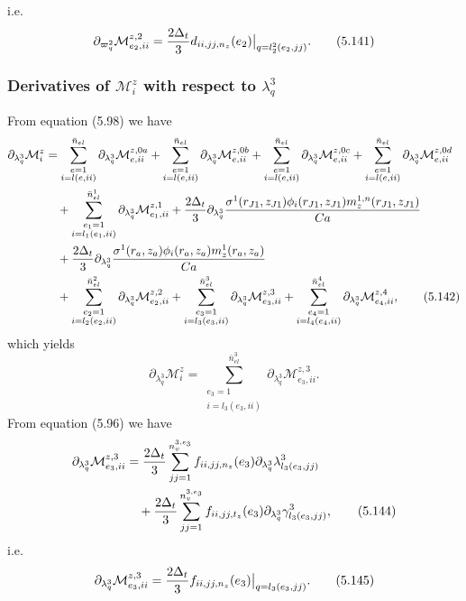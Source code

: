 \documentclass{article}
\begin{document}
i.e.
\begin{equation}
\partial_{\varpi_q^2}\mathcal{M}_{e_2,ii}^{z,2} = \frac{2\Delta_t}{3} d_{ii,jj,n_z}(e_2) \big|_{q=l_2^2(e_2,jj)}. \tag{5.141}
\end{equation}

\subsubsection{Derivatives of $\mathcal{M}_i^z$ with respect to $\lambda_q^3$} %
From equation (5.98) we have
\begin{align}
\partial_{\lambda_q^3}\mathcal{M}_i^z &= \sum_{\substack{e=1\\ i=l(e,ii)}}^{\bar{n}_{el}} \partial_{\lambda_q^3} \mathcal{M}_{e,ii}^{z,0a} + \sum_{\substack{e=1\\ i=l(e,ii)}}^{\bar{n}_{el}} \partial_{\lambda_q^3} \mathcal{M}_{e,ii}^{z,0b} + \sum_{\substack{e=1\\ i=l(e,ii)}}^{\bar{n}_{el}} \partial_{\lambda_q^3} \mathcal{M}_{e,ii}^{z,0c} + \sum_{\substack{e=1\\ i=l(e,ii)}}^{\bar{n}_{el}} \partial_{\lambda_q^3} \mathcal{M}_{e,ii}^{z,0d} \nonumber\\
&\quad + \sum_{\substack{e_1=1\\ i=l_1(e_1,ii)}}^{\bar{n}_{el}^1} \partial_{\lambda_q^3} \mathcal{M}_{e_1,ii}^{z,1} + \frac{2\Delta_t}{3} \partial_{\lambda_q^3} \frac{\sigma^1(r_{J1},z_{J1}) \phi_i(r_{J1},z_{J1}) m_z^{1,n}(r_{J1},z_{J1})}{Ca} \nonumber\\
&\quad + \frac{2\Delta_t}{3} \partial_{\lambda_q^3} \frac{\sigma^1(r_a,z_a) \phi_i(r_a,z_a) m_z^{1}(r_a,z_a)}{Ca} \nonumber\\
&\quad + \sum_{\substack{e_2=1\\ i=l_2(e_2,ii)}}^{\bar{n}_{el}^2} \partial_{\lambda_q^3} \mathcal{M}_{e_2,ii}^{z,2} + \sum_{\substack{e_3=1\\ i=l_3(e_3,ii)}}^{\bar{n}_{el}^3} \partial_{\lambda_q^3} \mathcal{M}_{e_3,ii}^{z,3} + \sum_{\substack{e_4=1\\ i=l_4(e_4,ii)}}^{\bar{n}_{el}^4} \partial_{\lambda_q^3} \mathcal{M}_{e_4,ii}^{z,4}, \tag{5.142}
\end{align}
which yields
\begin{equation}
\partial_{\lambda_q^3}\mathcal{M}_i^z = \sum_{\substack{e_3=1\\ i=l_3(e_3,ii)}}^{\bar{n}_{el}^3} \partial_{\lambda_q^3} \mathcal{M}_{e_3,ii}^{z,3}. \tag{5.143}
\end{equation}
From equation (5.96) we have
\begin{align}
\partial_{\lambda_q^3}\mathcal{M}_{e_3,ii}^{z,3} &= \frac{2\Delta_t}{3} \sum_{jj=1}^{n_v^{3,e_3}} f_{ii,jj,n_z}(e_3) \partial_{\lambda_q^3} \lambda_{l_3(e_3,jj)}^3 \nonumber\\
&\quad + \frac{2\Delta_t}{3} \sum_{jj=1}^{n_v^{3,e_3}} f_{ii,jj,t_z}(e_3) \partial_{\lambda_q^3} \gamma_{l_3(e_3,jj)}^3, \tag{5.144}
\end{align}
i.e.
\begin{equation}
\partial_{\lambda_q^3}\mathcal{M}_{e_3,ii}^{z,3} = \frac{2\Delta_t}{3} f_{ii,jj,n_z}(e_3) \big|_{q=l_3(e_3,jj)}. \tag{5.145}
\end{equation}
\end{document}
